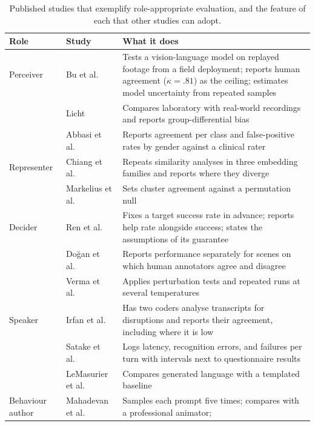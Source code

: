 \begin{table}[!t]
\caption{Published studies that exemplify role-appropriate evaluation, and
the feature of each that other studies can adopt.}
\label{tab:exemplars}
\small
\begin{tabularx}{\textwidth}{@{}L{1.9cm}L{3.3cm}Y@{}}
\toprule
Role & Study & What it does \\
\midrule
{} Perceiver & Bu et al.\ \cite{bu2025using} & Tests a vision-language
model on replayed footage from a field deployment; reports human agreement
($\kappa=.81$) as the ceiling; estimates model uncertainty from repeated
samples \\
 & Licht \cite{licht2025computational} & Compares laboratory with
real-world recordings and reports group-differential bias \\
 & Abbasi et al.\ \cite{abbasi2025robotled} & Reports agreement per class
and false-positive rates by gender against a clinical rater \\
 Representer & Chiang et al.\ \cite{chiang2025selfdisclosure} &
Repeats similarity analyses in three embedding families and reports where
they diverge \\
 & Markelius et al.\ \cite{markelius2026evaluating} & Sets cluster
agreement against a permutation null \\
 Decider & Ren et al.\ \cite{ren2023robots} & Fixes a target success
rate in advance; reports help rate alongside success; states the
assumptions of its guarantee \\
 & Do\u{g}an et al.\ \cite{dogan2025grace} & Reports performance separately
for scenes on which human annotators agree and disagree \\
 & Verma et al.\ \cite{verma2024theory} & Applies perturbation tests and
repeated runs at several temperatures \\
 Speaker & Irfan et al.\ \cite{irfan2025between} & Has two coders
analyse transcripts for disruptions and reports their agreement, including
where it is low \\
 & Satake et al.\ \cite{satake2026focus} & Logs latency, recognition
errors, and failures per turn with intervals next to questionnaire results \\
 & LeMasurier et al.\ \cite{lemasurier2024templated} & Compares generated
language with a templated baseline \\
 Behaviour author & Mahadevan et al.\ \cite{mahadevan2024generative}
& Samples each prompt five times; compares with a professional animator;

\end{tabularx}
\end{table}
